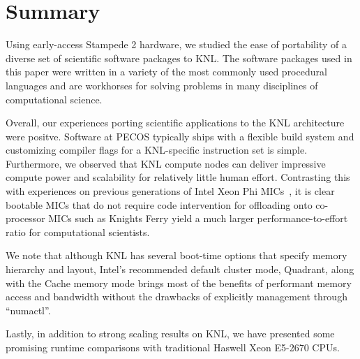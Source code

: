 \section{Summary}
\label{sec:summary}

Using early-access Stampede 2 hardware, we studied the ease of portability of a
diverse set of scientific software packages to KNL.  The software packages
used in this paper were written in a variety of the most commonly used
procedural languages and are workhorses for solving problems in many
disciplines of computational science.

Overall, our experiences porting scientific applications to the KNL
architecture were positve.  Software at PECOS typically ships with a
flexible build system and customizing compiler flags for a KNL-specific
instruction set is simple.  Furthermore, we observed that KNL compute nodes can
deliver impressive compute power and scalability for relatively little human
effort.  Contrasting this with experiences on previous generations of Intel
Xeon Phi MICs~\cite{schulz2012early}, it is clear bootable MICs that do not
require code intervention for offloading onto co-processor MICs such as Knights
Ferry yield a much larger performance-to-effort ratio for computational
scientists.

We note that although KNL has several boot-time options that specify memory
hierarchy and layout, Intel's recommended default cluster mode, Quadrant, along
with the Cache memory mode brings most of the benefits of performant memory access 
and bandwidth without the drawbacks of explicitly management through ``numactl''.

Lastly, in addition to strong scaling results on KNL, we have presented some
promising runtime comparisons with traditional Haswell Xeon E5-2670 CPUs.

